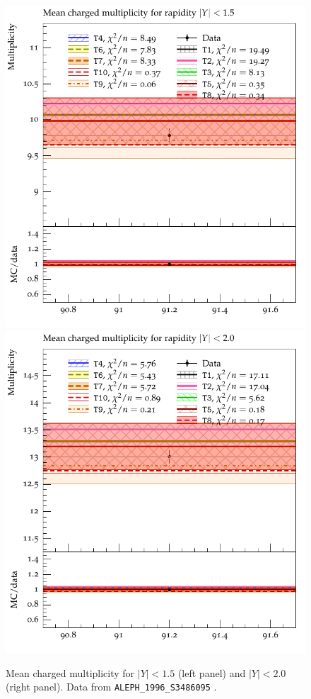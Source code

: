 \documentclass[aps,preprint,floatfix,nofootinbib,showpacs]{revtex4-1}
\begin{document}
\begin{figure}[!h]
 \centering
 \includegraphics[width=0.47\linewidth]{Figures/Mean_multiplicities/ALEPH_1996_S3486095_d22-x01-y01.pdf}
 \hfill
\includegraphics[width=0.47\linewidth]{Figures/Mean_multiplicities/ALEPH_1996_S3486095_d23-x01-y01.pdf}
\caption{Mean charged multiplicity for $|Y|<1.5$ (left panel) and $|Y|<2.0$ (right panel). Data
from \texttt{ALEPH\_1996\_S3486095} \cite{Barate:1996fi}.}
\label{Fig.22}
\end{figure}
\end{document}
